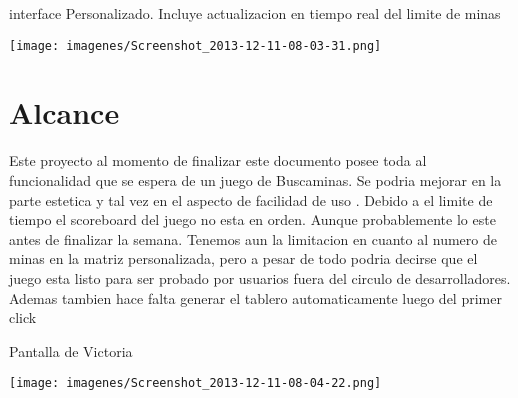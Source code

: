 \documentclass[11pt]{article} %
\begin{document}
\begin{center}
interface Personalizado. Incluye actualizacion en tiempo real del limite de minas 

\texttt{[image: imagenes/Screenshot\_2013-12-11-08-03-31.png]}
\end{center}



\section{Alcance}

Este proyecto al momento de finalizar este documento posee toda al funcionalidad que se espera de un juego de Buscaminas. Se podria mejorar en la parte estetica y tal vez en el aspecto de facilidad de uso . 
Debido a el limite de tiempo el scoreboard del juego no esta en orden. Aunque probablemente lo este antes de finalizar la semana. Tenemos aun la limitacion en cuanto al numero de minas en la matriz personalizada, pero a pesar de todo 
podria decirse que el juego esta listo para ser probado por usuarios fuera del circulo de desarrolladores.
Ademas tambien hace falta generar el tablero automaticamente luego del primer click

\begin{center}
Pantalla de Victoria

\texttt{[image: imagenes/Screenshot\_2013-12-11-08-04-22.png]}
\end{center}
\end{document}
